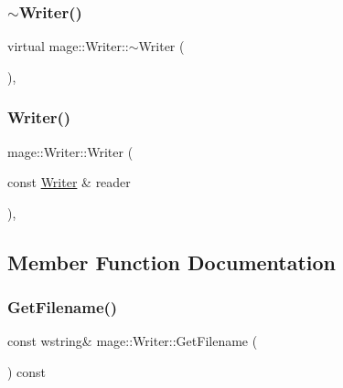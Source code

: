 \subsubsection{\texorpdfstring{$\sim$\+Writer()}{~Writer()}}
{\footnotesize\ttfamily virtual mage\+::\+Writer\+::$\sim$\+Writer (\begin{DoxyParamCaption}{ }\end{DoxyParamCaption})\hspace{0.3cm}{\ttfamily [virtual]}, {\ttfamily [default]}}

\hypertarget{classmage_1_1_writer_a0988d427f687ad5334c2ba74993e0d6e}{}\label{classmage_1_1_writer_a0988d427f687ad5334c2ba74993e0d6e} 
\subsubsection{\texorpdfstring{Writer()}{Writer()}\hspace{0.1cm}{\footnotesize\ttfamily [2/2]}}
{\footnotesize\ttfamily mage\+::\+Writer\+::\+Writer (\begin{DoxyParamCaption}\item[{const \hyperlink{classmage_1_1_writer}{Writer} \&}]{reader }\end{DoxyParamCaption})\hspace{0.3cm}{\ttfamily [private]}, {\ttfamily [delete]}}



\subsection{Member Function Documentation}
\hypertarget{classmage_1_1_writer_aa874f2ee6cdd6663078d213f10d984f1}{}\label{classmage_1_1_writer_aa874f2ee6cdd6663078d213f10d984f1} 
\subsubsection{\texorpdfstring{Get\+Filename()}{GetFilename()}}
{\footnotesize\ttfamily const wstring\& mage\+::\+Writer\+::\+Get\+Filename (\begin{DoxyParamCaption}{ }\end{DoxyParamCaption}) const}

\hypertarget{classmage_1_1_writer_a14fff6d050ad263bd351b26b86ca4186}{}\label{classmage_1_1_writer_a14fff6d050ad263bd351b26b86ca4186} 
